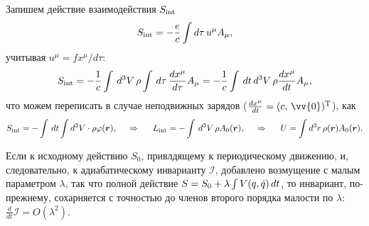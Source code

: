 Запишем действие взаимодействия $S_{\textnormal{int}}$
\begin{equation*}
    {S}_{\textnormal{int}} = - \frac{e}{c} \int d \tau\, u^\mu A_\mu,
\end{equation*}
учитывая $u^\mu = f x^\mu / d \tau$:
\begin{equation*}
    {S}_{\textnormal{int}} = - \frac{1}{c} \int \, d^3 V\, \rho \int \, d \tau\, \frac{d x^\mu}{d \tau}  A_\mu = 
    - \frac{1}{c} \int \, d t\, d^3 V\, \rho \frac{d x^\mu}{d t}  A_\mu,
\end{equation*}
что можем переписать в случае неподвижных зарядов ($\frac{d x^\mu}{d t} = (c,\, \vv{0})\T$), как
\begin{equation*}
    {S}_{\textnormal{int}} = - \int \, d t \int d^3 V \cdot \rho \varphi(\mbox{\boldmath $r$}),
    \hspace{0.5cm} \Rightarrow \hspace{0.5cm}
    {L}_{\textnormal{int}} = - \int \, d^3 V\, \rho A_0(\mbox{\boldmath $r$}),
    \hspace{0.5cm} \Rightarrow \hspace{0.5cm}
    U = \int d^3 r\, \rho(\mbox{\boldmath $r$}) A_0 (\mbox{\boldmath $r$}).
\end{equation*}

\begin{to_thr}
    Если к исходному действию $S_0$, привлдящему к периодическому движению, и, следовательно, к адиабатическому инварианту $\mathcal I$, добавлено возмущение с малым параметром $\lambda$, так что полной действие $S = S_0 + \lambda \int V(q, \dot{q})\, d t$, то инвариант, по-прежнему, сохарняется с точностью до членов второго порядка малости по $\lambda$: $\frac{d }{d t} \mathcal I = O(\lambda^2)$.
\end{to_thr}

